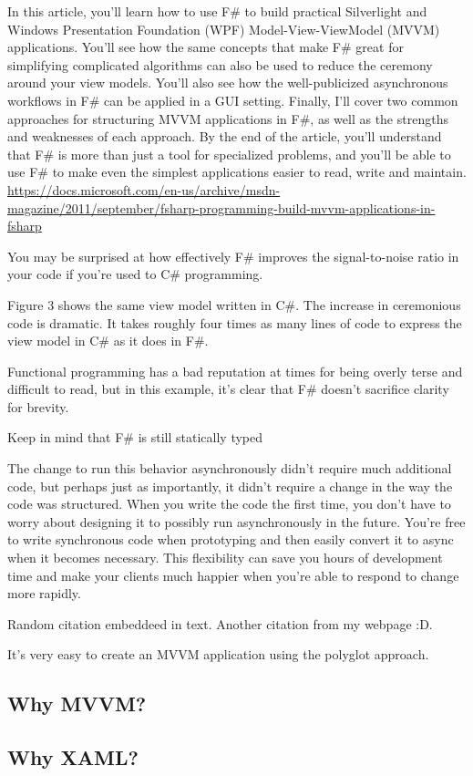     In this article, you’ll learn how to use F\# to build practical Silverlight and Windows Presentation Foundation (WPF) Model-View-ViewModel (MVVM) applications. You’ll see how the same concepts that make F\# great for simplifying complicated algorithms can also be used to reduce the ceremony around your view models. You’ll also see how the well-publicized asynchronous workflows in F\# can be applied in a GUI setting. Finally, I’ll cover two common approaches for structuring MVVM applications in F\#, as well as the strengths and weaknesses of each approach. By the end of the article, you’ll understand that F\# is more than just a tool for specialized problems, and you’ll be able to use F\# to make even the simplest applications easier to read, write and maintain. \\
    \url{https://docs.microsoft.com/en-us/archive/msdn-magazine/2011/september/fsharp-programming-build-mvvm-applications-in-fsharp}
    
    You may be surprised at how effectively F\# improves the signal-to-noise ratio in your code if you’re used to C\# programming.
    
    Figure 3 shows the same view model written in C\#. The increase in ceremonious code is dramatic. It takes roughly four times as many lines of code to express the view model in C\# as it does in F\#.
    
    
    Functional programming has a bad reputation at times for being overly terse and difficult to read, but in this example, it’s clear that F\# doesn’t sacrifice clarity for brevity.
    
    Keep in mind that F\# is still statically typed
    
    The change to run this behavior asynchronously didn’t require much additional code, but perhaps just as importantly, it didn’t require a change in the way the code was structured. When you write the code the first time, you don’t have to worry about designing it to possibly run asynchronously in the future. You’re free to write synchronous code when prototyping and then easily convert it to async when it becomes necessary. This flexibility can save you hours of development time and make your clients much happier when you’re able to respond to change more rapidly.
    
    Random citation \cite{DUMMY:1} embeddeed in text.
    Another citation \cite{kexugit} from my webpage :D.
    
    It’s very easy to create an MVVM application using the polyglot approach.

\subsection{Why MVVM?}

\subsection{Why XAML?}

